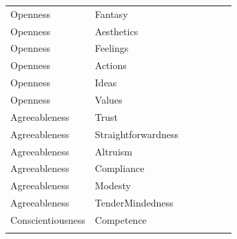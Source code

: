\documentclass{article}\usepackage[]{graphicx}\usepackage[]{color}
\begin{document}
\begin{table}
\begin{tabular}[t]{lllllll}
Openness & Fantasy & \cellcolor{white}{0.41} & \cellcolor{white}{0.1} & \cellcolor{white}{-0.55} & \cellcolor{white}{0} & \cellcolor{white}{0.24}\\
Openness & Aesthetics & \cellcolor{white}{0.37} & \cellcolor{white}{0.3} & \cellcolor{white}{-0.3} & \cellcolor{white}{-0.1} & \cellcolor{white}{0.46}\\
Openness & Feelings & \cellcolor{yellow}{0.66} & \cellcolor{white}{0.19} & \cellcolor{white}{-0.22} & \cellcolor{white}{0.27} & \cellcolor{white}{0.07}\\
\addlinespace
Openness & Actions & \cellcolor{white}{0.38} & \cellcolor{white}{0.01} & \cellcolor{white}{-0.57} & \cellcolor{white}{-0.09} & \cellcolor{white}{0.12}\\
Openness & Ideas & \cellcolor{white}{0.35} & \cellcolor{white}{-0.09} & \cellcolor{white}{-0.23} & \cellcolor{white}{0.02} & \cellcolor{yellow}{0.57}\\
Openness & Values & \cellcolor{white}{0.47} & \cellcolor{white}{0.24} & \cellcolor{white}{-0.35} & \cellcolor{white}{-0.05} & \cellcolor{white}{0.27}\\
Agreeableness & Trust & \cellcolor{yellow}{0.57} & \cellcolor{white}{-0.06} & \cellcolor{white}{-0.12} & \cellcolor{white}{-0.31} & \cellcolor{white}{-0.2}\\
Agreeableness & Straightforwardness & \cellcolor{white}{0.43} & \cellcolor{white}{0.19} & \cellcolor{white}{0.26} & \cellcolor{white}{-0.4} & \cellcolor{white}{-0.1}\\
\addlinespace
Agreeableness & Altruism & \cellcolor{yellow}{0.78} & \cellcolor{white}{0.03} & \cellcolor{white}{-0.04} & \cellcolor{white}{-0.21} & \cellcolor{white}{-0.24}\\
Agreeableness & Compliance & \cellcolor{white}{0.42} & \cellcolor{white}{0.17} & \cellcolor{white}{-0.06} & \cellcolor{white}{-0.67} & \cellcolor{white}{-0.05}\\
Agreeableness & Modesty & \cellcolor{white}{0.36} & \cellcolor{white}{0.43} & \cellcolor{white}{0.15} & \cellcolor{white}{-0.24} & \cellcolor{white}{-0.09}\\
Agreeableness & TenderMindedness & \cellcolor{yellow}{0.55} & \cellcolor{white}{0.29} & \cellcolor{white}{-0.19} & \cellcolor{white}{-0.13} & \cellcolor{white}{0}\\
Conscientiousness & Competence & \cellcolor{yellow}{0.6} & \cellcolor{white}{-0.42} & \cellcolor{white}{0.35} & \cellcolor{white}{0.07} & \cellcolor{white}{0.15}\\
\addlinespace

\end{tabular}
\end{table}
\end{document}
